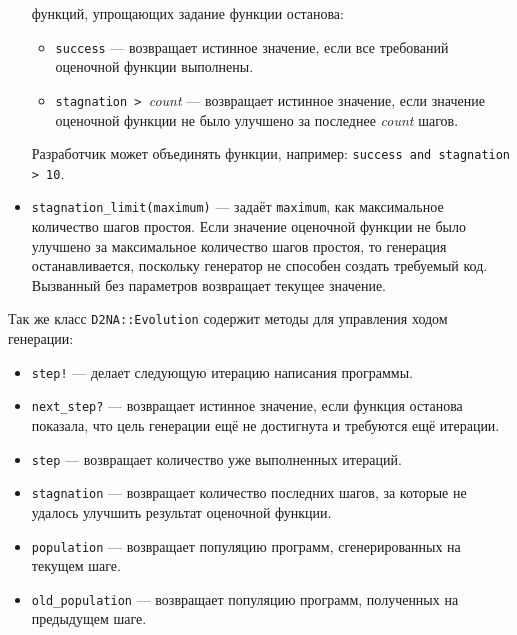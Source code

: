 \documentclass[utf8,a5paper,portrait,10pt]{eskdtext}
\begin{document}
\begin{itemize}
        функций, упрощающих задание функции останова:
        \begin{itemize}
          \item \texttt{success} — возвращает истинное значение, если все
                требований оценочной функции выполнены.
          \item \texttt{stagnation > }\textit{count} — возвращает истинное
                значение, если значение оценочной функции не было улучшено за
                последнее \textit{count} шагов.
        \end{itemize}
        Разработчик может объединять функции, например:
        \texttt{success and stagnation > 10}.
  \item \texttt{stagnation\_limit(maximum)} — задаёт \texttt{maximum}, как
        максимальное количество шагов простоя. Если значение оценочной функции
        не было улучшено за максимальное количество шагов простоя, то генерация
        останавливается, поскольку генератор не способен создать требуемый код.
        Вызванный без параметров возвращает текущее значение.
\end{itemize}

\newpage
Так же класс \texttt{D2NA::Evolution} содержит методы для управления ходом
генерации:
\begin{itemize}
  \item \texttt{step!} — делает следующую итерацию написания программы.
  \item \texttt{next\_step?} — возвращает истинное значение, если функция
        останова показала, что цель генерации ещё не достигнута и требуются ещё
        итерации.
  \item \texttt{step} — возвращает количество уже выполненных итераций.
  \item \texttt{stagnation} — возвращает количество последних шагов, за которые
        не удалось улучшить результат оценочной функции.
  \item \texttt{population} — возвращает популяцию программ, сгенерированных на
        текущем шаге.
  \item \texttt{old\_population} — возвращает популяцию программ, полученных на
        предыдущем шаге.
\end{itemize}
\end{document}
